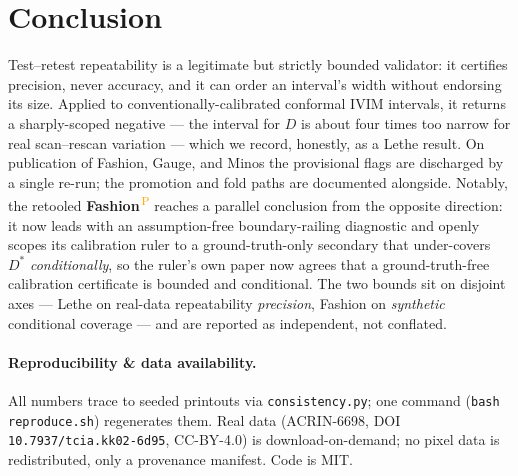 \documentclass[11pt]{article}
\newcommand{\PROV}{\textsuperscript{\textcolor{orange}{\,P}}}
\newcommand{\Dstar}{D^{*}}
\begin{document}
\section{Conclusion}
Test--retest repeatability is a legitimate but strictly bounded validator: it certifies
precision, never accuracy, and it can order an interval's width without endorsing its size.
Applied to conventionally-calibrated conformal IVIM intervals, it returns a sharply-scoped
negative --- the interval for $D$ is about four times too narrow for real scan--rescan
variation --- which we record, honestly, as a Lethe result. On publication of Fashion,
Gauge, and Minos the provisional flags are discharged by a single re-run; the promotion and
fold paths are documented alongside. Notably, the retooled \textbf{Fashion}\PROV{} reaches a
parallel conclusion from the opposite direction: it now leads with an assumption-free
boundary-railing diagnostic and openly scopes its calibration ruler to a ground-truth-only
secondary that under-covers $\Dstar$ \emph{conditionally}, so the ruler's own paper now
agrees that a ground-truth-free calibration certificate is bounded and conditional. The two
bounds sit on disjoint axes --- Lethe on real-data repeatability \emph{precision}, Fashion on
\emph{synthetic} conditional coverage --- and are reported as independent, not conflated.

\paragraph{Reproducibility \& data availability.} All numbers trace to seeded printouts via
\texttt{consistency.py}; one command (\texttt{bash reproduce.sh}) regenerates them. Real
data (ACRIN-6698, DOI \texttt{10.7937/tcia.kk02-6d95}, CC-BY-4.0) is download-on-demand; no
pixel data is redistributed, only a provenance manifest. Code is MIT.
\end{document}
